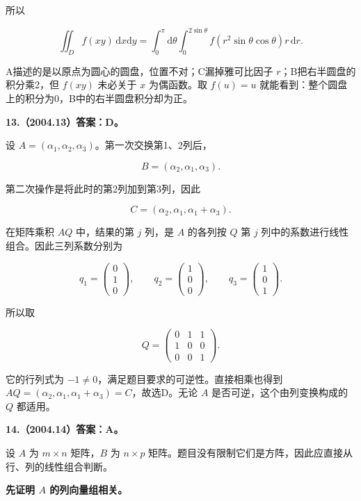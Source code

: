 \documentclass[UTF8,11pt,fontset=windows]{ctexart}
\begin{document}
所以

$$
\boxed{\iint_D f(xy)\,\mathrm dx\mathrm dy
=\int_0^\pi\mathrm d\theta\int_0^{2\sin\theta}
 f(r^2\sin\theta\cos\theta)r\,\mathrm dr.}
$$

A描述的是以原点为圆心的圆盘，位置不对；C漏掉雅可比因子 $r$；B把右半圆盘的积分乘2，但 $f(xy)$ 未必关于 $x$ 为偶函数。取 $f(u)=u$ 就能看到：整个圆盘上的积分为0，B中的右半圆盘积分却为正。

\clearpage

\textbf{13.（2004.13）答案：D。}

设 $A=(\alpha_1,\alpha_2,\alpha_3)$。第一次交换第1、2列后，

$$
B=(\alpha_2,\alpha_1,\alpha_3).
$$

第二次操作是将此时的第2列加到第3列，因此

$$
C=(\alpha_2,\alpha_1,\alpha_1+\alpha_3).
$$

在矩阵乘积 $AQ$ 中，结果的第 $j$ 列，是 $A$ 的各列按 $Q$ 第 $j$ 列中的系数进行线性组合。因此三列系数分别为

$$
q_1=\begin{pmatrix}0\\1\\0\end{pmatrix},\qquad
q_2=\begin{pmatrix}1\\0\\0\end{pmatrix},\qquad
q_3=\begin{pmatrix}1\\0\\1\end{pmatrix}.
$$

所以取

$$
\boxed{Q=\begin{pmatrix}0&1&1\\1&0&0\\0&0&1\end{pmatrix}.}
$$

它的行列式为 $-1\ne0$，满足题目要求的可逆性。直接相乘也得到 $AQ=(\alpha_2,\alpha_1,\alpha_1+\alpha_3)=C$，故选D。无论 $A$ 是否可逆，这个由列变换构成的 $Q$ 都适用。

\clearpage

\textbf{14.（2004.14）答案：A。}

设 $A$ 为 $m\times n$ 矩阵，$B$ 为 $n\times p$ 矩阵。题目没有限制它们是方阵，因此应直接从行、列的线性组合判断。

\textbf{先证明 $A$ 的列向量组相关。}
\end{document}
